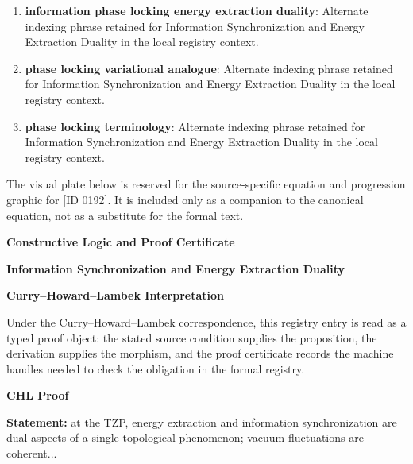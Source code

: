 \begin{enumerate}[leftmargin=1.6em,itemsep=6pt,topsep=4pt]
\item \textbf{information phase locking energy extraction duality}: Alternate indexing phrase retained for Information Synchronization and Energy Extraction Duality in the local registry context.
\item \textbf{phase locking variational analogue}: Alternate indexing phrase retained for Information Synchronization and Energy Extraction Duality in the local registry context.
\item \textbf{phase locking terminology}: Alternate indexing phrase retained for Information Synchronization and Energy Extraction Duality in the local registry context.
\end{enumerate}

\begingroup\footnotesize\sloppy
The visual plate below is reserved for the source-specific equation and progression graphic for [ID 0192]. It is included only as a companion to the canonical equation, not as a substitute for the formal text.
\par\endgroup
\ifTZPDarkEdition
{}
\fi

\clearpage
\begingroup\tzpsupportsetup
\noindent\textbf{\fontsize{10.8pt}{12.8pt}\selectfont [ID 0192] Constructive Logic and Proof Certificate}\par
\noindent\textbf{\fontsize{10pt}{12pt}\selectfont Information Synchronization and Energy Extraction Duality}\par
\vspace{0.45em}
\begingroup
\footnotesize
\setlength{\parskip}{0.22em}
\setlength{\parindent}{0pt}
\noindent\textbf{Curry--Howard--Lambek Interpretation}\par
Under the Curry--Howard--Lambek correspondence, this registry entry is read as a typed proof
object: the stated source condition supplies the proposition, the derivation supplies the
morphism, and the proof certificate records the machine handles needed to check the obligation
in the formal registry.

\vspace{0.45em}
\noindent\textbf{CHL Proof}\par
\textbf{Statement:} at the TZP, energy extraction and information synchronization are dual aspects of a
single topological phenomenon; vacuum fluctuations are coherent...

